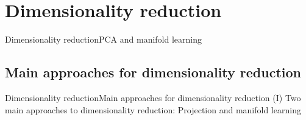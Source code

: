 \documentclass[10pt,compress]{beamer} %
\begin{document}
\section{Dimensionality reduction}
{
\sectionheaderWhite %
\begin{frame}{Dimensionality reduction}{PCA and manifold learning}
\end{frame}
}

\subsection{Main approaches for dimensionality reduction}

\begin{frame}{Dimensionality reduction}{Main approaches for dimensionality reduction (I)}
	Two main approaches to dimensionality reduction: Projection and \alert{manifold learning}

    \bigskip


\end{frame}
\end{document}
